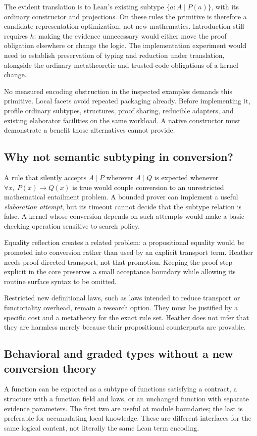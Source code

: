 \documentclass[11pt,letterpaper]{article}
\theoremstyle{definition}\newtheorem{definition}[theorem]{Definition}
\theoremstyle{remark}\newtheorem{remark}[theorem]{Remark}
\begin{document}
The evident translation is to Lean's existing subtype
$\{a:A\mid P(a)\}$, with its ordinary constructor and projections. On these
rules the primitive is therefore a candidate representation optimization, not
new mathematics. Introduction still requires $h$: making the evidence
unnecessary would either move the proof obligation elsewhere or change the
logic. The implementation experiment would need to establish preservation of
typing and reduction under translation, alongside the ordinary metatheoretic
and trusted-code obligations of a kernel change.

No measured encoding obstruction in the inspected examples demands this
primitive. Local facets avoid repeated packaging already. Before implementing
it, profile ordinary subtypes, structures, proof sharing, reducible adapters,
and existing elaborator facilities on the same workload. A native constructor
must demonstrate a benefit those alternatives cannot provide.

\subsection{Why not semantic subtyping in conversion?}
A rule that silently accepts $A\mid P$ wherever $A\mid Q$ is expected whenever
$\forall x,\ P(x)\to Q(x)$ is true would couple conversion to an unrestricted
mathematical entailment problem. A bounded prover can implement a useful
\emph{elaboration attempt}, but its timeout cannot decide that the subtype
relation is false. A kernel whose conversion depends on such attempts would
make a basic checking operation sensitive to search policy.

Equality reflection creates a related problem: a propositional equality would
be promoted into conversion rather than used by an explicit transport term.
Heather needs proof-directed transport, not that promotion. Keeping the proof
step explicit in the core preserves a small acceptance boundary while allowing
its routine surface syntax to be omitted.

Restricted new definitional laws, such as laws intended to reduce transport or
functoriality overhead, remain a research option. They must be justified by a
specific cost and a metatheory for the exact rule set. Heather does not infer
that they are harmless merely because their propositional counterparts are
provable.

\subsection{Behavioral and graded types without a new conversion theory}
A function can be exported as a subtype of functions satisfying a contract,
a structure with a function field and laws, or an unchanged function with
separate evidence parameters. The first two are useful at module boundaries;
the last is preferable for accumulating local knowledge. These are different
interfaces for the same logical content, not literally the same Lean term
encoding.
\end{document}
